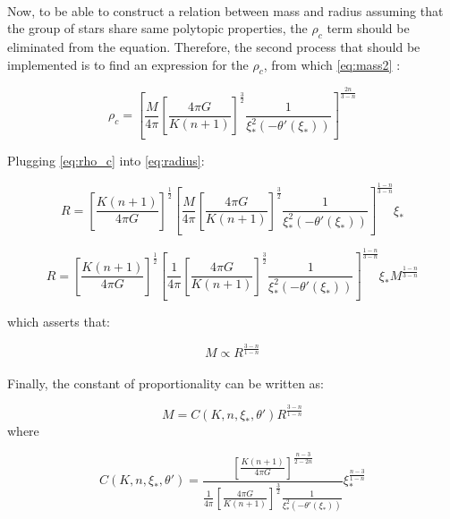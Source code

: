 \documentclass[letterpaper,12pt]{article}
\begin{document}
\paragraph{} Now, to be able to construct a relation between mass and radius assuming that the group of stars share same polytopic properties, the $\rho_c$ term should be eliminated from the equation. Therefore, the second process that should be implemented is to find an expression for the $\rho_c$, from which \eqref{eq:mass2} :

\begin{equation}
    \label{eq:rho_c}
    \rho_c = \left[\frac{M}{4 \pi} \left[\frac{4 \pi G}{K \left(n+1\right)}\right]^{\frac{3}{2}}  \frac{1}{\xi_*^2\left(-\theta'(\xi_*)\right)}\right]^{\frac{2n}{3-n}}
\end{equation}

Plugging \eqref{eq:rho_c} into \eqref{eq:radius}:

\begin{equation*}
    R = \left[\frac{K \left(n+1\right)}{4 \pi G}\right]^{\frac{1}{2}} \left[\frac{M}{4 \pi} \left[\frac{4 \pi G}{K \left(n+1\right)}\right]^{\frac{3}{2}}  \frac{1}{\xi_*^2\left(-\theta'(\xi_*)\right)}\right]^{\frac{1-n}{3-n}} \xi_* 
\end{equation*}

\begin{equation*}
    R =  \left[\frac{K \left(n+1\right)}{4 \pi G}\right]^{\frac{1}{2}} \left[\frac{1}{4 \pi} \left[\frac{4 \pi G}{K \left(n+1\right)}\right]^{\frac{3}{2}}  \frac{1}{\xi_*^2\left(-\theta'(\xi_*)\right)}\right]^{\frac{1-n}{3-n}} \xi_* M^{\frac{1-n}{3-n}} 
\end{equation*}

which asserts that:

\begin{equation*}
    M \propto R^{\frac{3-n}{1-n}}
\end{equation*}

\paragraph{} Finally, the constant of proportionality can be written as:

\begin{equation}
    \label{eq:mass-radius-prop}
    M = C(K, n, \xi_*, \theta') R^{\frac{3-n}{1-n}} 
\end{equation}
where 

\begin{equation}
    \label{eq:const-prop}
  \boxed{  C(K, n, \xi_*, \theta') = \frac{ \left[\frac{K \left(n+1\right)}{4 \pi G}\right]^{\frac{n-3}{2 - 2n}} }{\frac{1}{4 \pi} \left[\frac{4 \pi G}{K \left(n+1\right)}\right]^{\frac{3}{2}}  \frac{1}{\xi_*^2\left(-\theta'(\xi_*)\right)}} \xi_*^{\frac{n-3}{1-n}} }
\end{equation}
\end{document}
